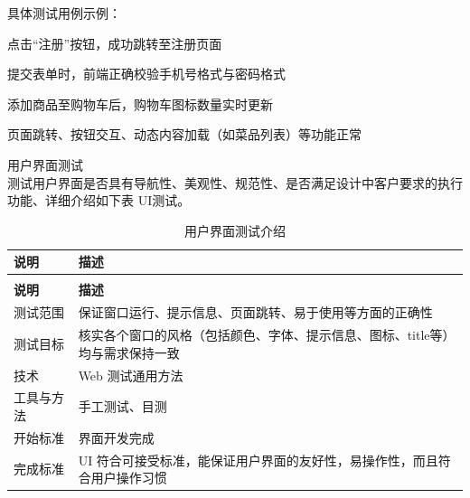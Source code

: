 \begin{levellist}
\begin{levellist}
\begin{levellist}
            具体测试用例示例：
            \begin{levellist}
                \item 点击“注册”按钮，成功跳转至注册页面
                \item 提交表单时，前端正确校验手机号格式与密码格式
                \item 添加商品至购物车后，购物车图标数量实时更新
                \item 页面跳转、按钮交互、动态内容加载（如菜品列表）等功能正常
            \end{levellist}


            \item 用户界面测试 \\
            测试用户界面是否具有导航性、美观性、规范性、是否满足设计中客户要求的执行功能、详细介绍如下表 UI测试。


            \begin{longtable}{>{\centering\arraybackslash}m{2.5cm} >{\centering\arraybackslash}m{12cm}}

                \caption{用户界面测试介绍} \label{tab:training}                 \\

                \toprule
                \textbf{说明} & \textbf{描述}                               \\
                \midrule
                \endfirsthead

                \multicolumn{2}{c}{{\tablename\ \thetable{} 续表}}        \\
                \toprule
                \textbf{说明} & \textbf{描述}                               \\
                \midrule
                \endhead

                \bottomrule
                \endfoot


                测试范围        & 保证窗口运行、提示信息、页面跳转、易于使用等方面的正确性              \\
                测试目标        & 核实各个窗口的风格（包括颜色、字体、提示信息、图标、title等）均与需求保持一致 \\
                技术          & Web 测试通用方法                                \\
                工具与方法       & 手工测试、目测                                   \\
                开始标准        & 界面开发完成                                    \\
                完成标准        & UI 符合可接受标准，能保证用户界面的友好性，易操作性，而且符合用户操作习惯    \\
            \end{longtable}



\end{levellist}
\end{levellist}
\end{levellist}
